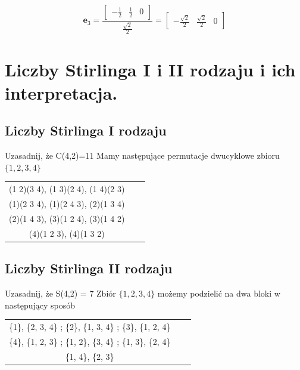 \documentclass[12pt]{article}
\begin{document}
    \[
        \mathbf{e}_3 =
        \frac
        {\begin{bmatrix}
             -\frac{1}{2} & \frac{1}{2} & 0
        \end{bmatrix}}
        {\frac{\sqrt{2}}{2}}
        =
        \begin{bmatrix}
            -\frac{\sqrt{2}}{2} & \frac{\sqrt{2}}{2} & 0
        \end{bmatrix}
    \]

    \newpage

    \section{Liczby Stirlinga I i II rodzaju i ich interpretacja.}
    \subsection{Liczby Stirlinga I rodzaju}
    Uzasadnij, że C(4,2)=11\newline
    Mamy następujące permutacje dwucyklowe zbioru $\{1, 2, 3, 4\}$ \newline

    \begin{center}
        \begin{tabular}{ c c c }
            (1 2)(3 4), (1 3)(2 4), (1 4)(2 3)\\
            (1)(2 3 4), (1)(2 4 3), (2)(1 3 4)\\
            (2)(1 4 3), (3)(1 2 4), (3)(1 4 2)\\
            (4)(1 2 3), (4)(1 3 2)
        \end{tabular}
    \end{center}

    \subsection{Liczby Stirlinga II rodzaju}
    Uzasadnij, że S(4,2) = 7 \newline
    Zbiór $\{1,2,3,4\}$ możemy podzielić na dwa bloki w następujący sposób

    \begin{center}
        \begin{tabular}{ c c c }
            \{1\}, \{2, 3, 4\} ; \{2\}, \{1, 3, 4\} ; \{3\}, \{1, 2, 4\} \\
            \{4\}, \{1, 2, 3\} ; \{1, 2\}, \{3, 4\} ; \{1, 3\}, \{2, 4\} \\
            \{1, 4\}, \{2, 3\}
        \end{tabular}
    \end{center}
    \newpage
\end{document}
